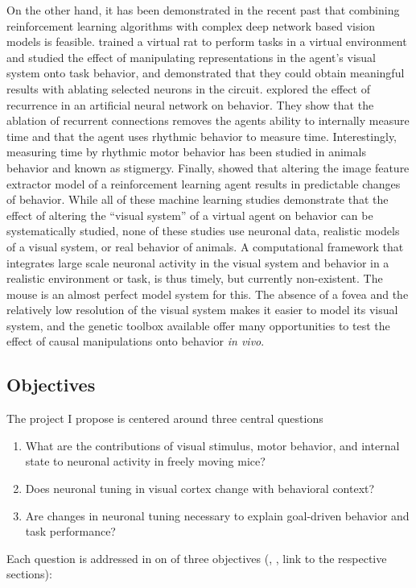 \documentclass[B2,COG]{ercgrant}
\begin{document}
On the other hand, it has been demonstrated in the recent past that combining reinforcement learning algorithms with complex deep network based vision models is feasible. 
\textcite{Merel2020-hf} trained a virtual rat to perform tasks in a virtual environment and studied the effect of manipulating representations in the agent's visual system onto task behavior, and demonstrated that they could obtain meaningful results with ablating selected neurons in the circuit. 
\textcite{Deverett2019-gs} explored the effect of recurrence in an artificial neural network on behavior. 
They show that the ablation of recurrent connections removes the agents ability to internally measure time and that the agent uses rhythmic behavior to measure time. 
Interestingly, measuring time by rhythmic motor behavior has been studied in animals behavior and known as stigmergy.
Finally, \textcite{Hilton2020-jz} showed that altering the image feature extractor model of a reinforcement learning agent results in predictable changes of behavior.
While all of these machine learning studies demonstrate that the effect of altering the ``visual system'' of a virtual agent on behavior can be systematically studied, none of these studies use neuronal data, realistic models of a visual system, or real behavior of animals. 
A computational framework that integrates large scale neuronal activity in the visual system and behavior in a realistic environment or task, is thus timely, but currently non-existent. 
The mouse is an almost perfect model system for this.
The absence of a fovea and the relatively low resolution of the visual system makes it easier to model its visual system, and the genetic toolbox available offer many opportunities to test the effect of causal manipulations onto behavior \textit{in vivo}.

\subsection{Objectives}
The project I propose is centered around three central questions
\begin{enumerate}
    \item What are the contributions of visual stimulus, motor behavior, and internal state to neuronal activity in freely moving mice?
    \item Does neuronal tuning in visual cortex change with behavioral context?
    \item Are changes in neuronal tuning necessary to explain goal-driven behavior and task performance?
\end{enumerate}
Each question is addressed in on of three objectives (, ,  link to the respective sections):
\end{document}
